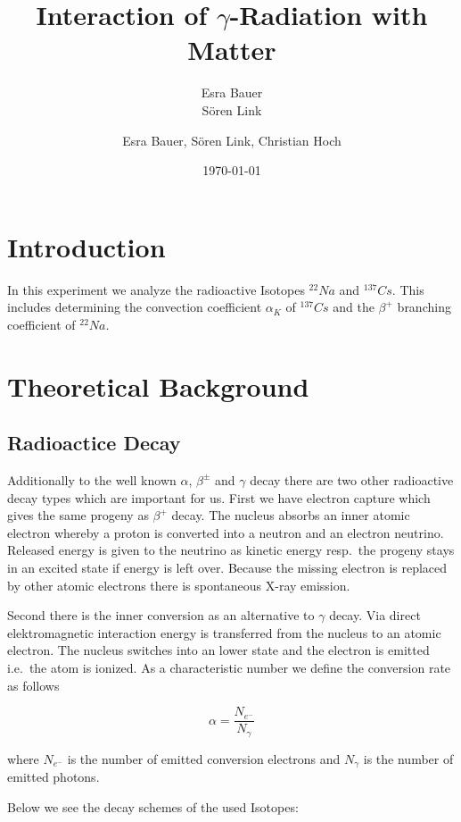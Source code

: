 \documentclass[bigchapter,colorback,accentcolor=tud4b,linedtoc,11pt]{tudreport}
\title{Interaction of $\gamma$-Radiation with Matter}
\subtitle{Esra Bauer  \\Sören Link}
\author{Esra Bauer, Sören Link, Christian Hoch}
\date{\today}
\begin{document}

\maketitle

\tableofcontents

\chapter{Introduction}
In this experiment we analyze the radioactive Isotopes $^{22}Na$ and
$^{137}Cs$. This includes determining the convection coefficient $\alpha_K$ of
$^{137}Cs$ and the $\beta^+$ branching coefficient of $^{22}Na$.

\chapter{Theoretical Background}
\section{Radioactice Decay}

Additionally to the well known $\alpha$, $\beta^{\pm}$ and $\gamma$ decay there are two other radioactive decay types which are important for us. First we have electron capture which gives the same progeny as $\beta^+$ decay. The nucleus absorbs an inner atomic electron whereby a proton is converted into a neutron and an electron neutrino. Released energy is given to the neutrino as kinetic energy resp.\ the progeny stays in an excited state if energy is left over. Because the missing electron is replaced by other atomic electrons there is spontaneous X-ray emission.

Second there is the inner conversion as an alternative to $\gamma$ decay. Via direct elektromagnetic interaction energy is transferred from the nucleus to an atomic electron. The nucleus switches into an lower state and the electron is emitted i.e.\ the atom is ionized. As a characteristic number we define the conversion rate as follows

$$\alpha = \frac{N_{e^-}}{N_{\gamma}}$$

where $N_{e^-}$ is the number of emitted conversion electrons and $N_{\gamma}$ is the number of emitted photons.

Below we see the decay schemes of the used Isotopes:
\end{document}
